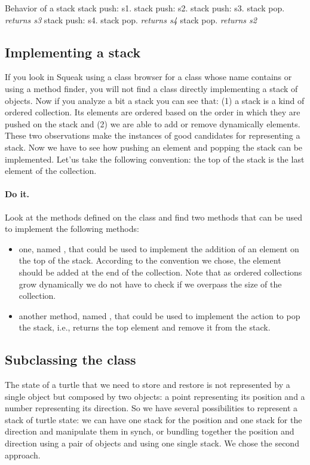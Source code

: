 \begin{scriptwithtitle}{Behavior of a stack}
stack push: s1.
stack push: s2.
stack push: s3.
stack pop. \emph{returns s3}
stack push: s4.
stack pop. \emph{returns s4}
stack pop. \emph{returns s2}
\end{scriptwithtitle}



\subsection{Implementing a stack} 

If you look in Squeak using a class browser for a class whose name
contains  or using a method finder, you will not find a
class directly implementing a stack of objects. Now if you analyze a
bit a stack you can see that: (1) a stack is a kind of ordered
collection. Its elements are ordered based on the order in which they
are pushed on the stack and (2) we are able to add or remove
dynamically elements. These two observations make the instances of
 good candidates for representing a stack. Now
we have to see how pushing an element and popping the stack can be
implemented. Let'us take the following convention: the top of the
stack is the last element of the collection.

\paragraph{Do it.} Look at the methods defined on the class 
and find two methods that can be used to implement the following methods:

\begin{itemize}
\item one, named , that could
be used to implement the addition of an element on the top of the
stack. According to the convention we chose, the element should be
added at the end of the collection. Note that as ordered collections
grow dynamically we do not have to check if we overpass the size of
the collection.

\item another method, named , that could be
used to implement the action to pop the stack, i.e., returns the top
element and remove it from the stack.
\end{itemize}

\subsection{Subclassing the class }
The state of a turtle that we need to store and restore is not
represented by a single object but composed by two objects: a point
representing its position and a number representing its direction. So
we have several possibilities to represent a stack of turtle state: we
can have one stack for the position and one stack for the direction
and manipulate them in synch, or bundling together the position and
direction using a pair of objects and using one single stack. We chose
the second approach.

